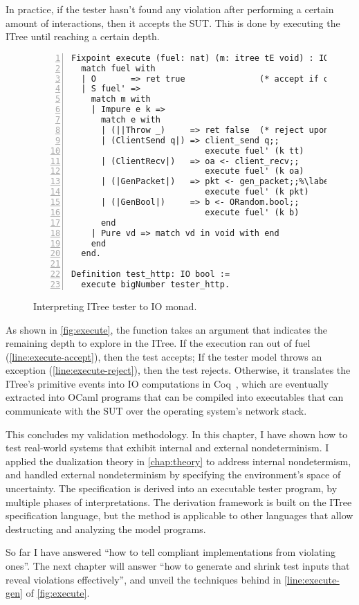 In practice, if the tester hasn't found any violation after performing a certain
amount of interactions, then it accepts the SUT.  This is done by executing the
ITree until reaching a certain depth.

\begin{figure}
\begin{lstlisting}[numbers=left]
Fixpoint execute (fuel: nat) (m: itree tE void) : IO bool :=
  match fuel with
  | O       => ret true               (* accept if out of fuel *)%\label{line:execute-accept}%
  | S fuel' =>
    match m with
    | Impure e k =>
      match e with
      | (||Throw _)     => ret false  (* reject upon exception *)%\label{line:execute-reject}%
      | (ClientSend q|) => client_send q;;
                           execute fuel' (k tt)
      | (ClientRecv|)   => oa <- client_recv;;
                           execute fuel' (k oa)
      | (|GenPacket|)   => pkt <- gen_packet;;%\label{line:execute-gen}%
                           execute fuel' (k pkt)
      | (|GenBool|)     => b <- ORandom.bool;;
                           execute fuel' (k b)
      end
    | Pure vd => match vd in void with end
    end
  end.

Definition test_http: IO bool :=
  execute bigNumber tester_http.
\end{lstlisting}
\caption{Interpreting ITree tester to IO monad.}
\label{fig:execute}
\end{figure}

As shown in \autoref{fig:execute}, the  function takes an
argument  that indicates the remaining depth to explore in the ITree.
If the execution ran out of fuel (\autoref{line:execute-accept}), then the test
accepts; If the tester model throws an exception
(\autoref{line:execute-reject}), then the test rejects.  Otherwise, it
translates the ITree's primitive events into IO computations in
Coq~\cite{SimpleIO}, which are eventually extracted into OCaml programs that can
be compiled into executables that can communicate with the SUT over the
operating system's network stack.

This concludes my validation methodology.  In this chapter, I have shown how to
test real-world systems that exhibit internal and external nondeterminism.  I
applied the dualization theory in \autoref{chap:theory} to address internal
nondetermism, and handled external nondeterminism by specifying the
environment's space of uncertainty.  The specification is derived into an
executable tester program, by multiple phases of interpretations.  The
derivation framework is built on the ITree specification language, but the
method is applicable to other languages that allow destructing and analyzing the
model programs.

So far I have answered ``how to tell compliant implementations from violating
ones''.  The next chapter will answer ``how to generate and shrink test inputs
that reveal violations effectively'', and unveil the techniques behind
 in \autoref{line:execute-gen} of \autoref{fig:execute}.
